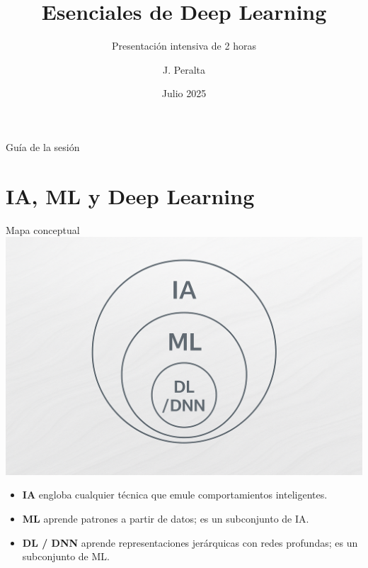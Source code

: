 \documentclass[8pt,spanish]{beamer}
\title{\textbf{Esenciales de Deep Learning}}
\subtitle{Presentación intensiva de 2 horas}
\author{J. Peralta}
\institute{Universidad Andrés Bello}
\date{Julio 2025}
\begin{document}
\begin{frame}
  \titlepage
\end{frame}

\begin{frame}{Guía de la sesión}
  \tableofcontents
\end{frame}


\section{IA, ML y Deep Learning}
\begin{frame}{Mapa conceptual}
  \centering
  \includegraphics[width=.5\textwidth]{Concept-1.png}

  \begin{itemize}
    \item \textbf{IA} engloba cualquier técnica que emule comportamientos inteligentes.
    \item \textbf{ML} aprende patrones a partir de datos; es un subconjunto de IA.
    \item \textbf{DL / DNN} aprende representaciones jerárquicas con redes profundas;
      es un subconjunto de ML.
  \end{itemize}
\end{frame}
\end{document}
